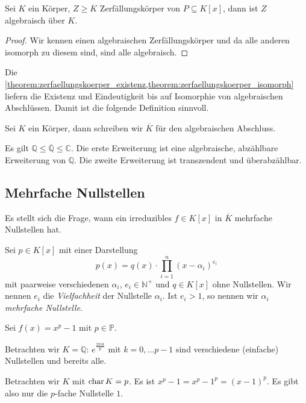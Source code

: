 \begin{corollary}
    Sei $K$ ein Körper, $Z \ge K$ Zerfällungskörper von $P \subseteq K[x]$, dann ist $Z$ algebraisch über $K$.
\end{corollary}
\begin{proof}
    Wir kennen einen algebraischen Zerfällungskörper und da alle anderen isomorph zu diesem sind, sind alle algebraisch.
\end{proof}

\begin{remark}
    Die \cref{theorem:zerfaellungskoerper_existenz,theorem:zerfaellungskoerper_isomorph} liefern die Existenz und Eindeutigkeit bis auf Isomorphie von algebraischen Abschlüssen. Damit ist die folgende Definition sinnvoll.
\end{remark}

\begin{definition}
    Sei $K$ ein Körper, dann schreiben wir $\overline{K}$ für den algebraischen Abschluss.
\end{definition}

\begin{remark}
    Es gilt $\mathbb{Q} \le \overline{\mathbb{Q}} \le \mathbb{C}$. Die erste Erweiterung ist eine algebraische, abzählbare Erweiterung von $\mathbb{Q}$. Die zweite Erweiterung ist transzendent und überabzählbar.
\end{remark}

\subsection{Mehrfache Nullstellen}
Es stellt sich die Frage, wann ein irreduzibles $f \in K[x]$ in $\overline{K}$ mehrfache Nullstellen hat.

\begin{definition}
    Sei $p \in K[x]$ mit einer Darstellung
    $$ p(x) = q(x) \cdot \prod_{i=1}^n (x-\alpha_i)^{e_i} $$
    mit paarweise verschiedenen $\alpha_i$, $e_i \in \mathbb{N}^+$ und $q \in K[x]$ ohne Nullstellen. Wir nennen $e_i$ die \emph{Vielfachheit} der Nullstelle $\alpha_i$. Ist $e_i > 1$, so nennen wir $\alpha_i$ \emph{mehrfache Nullstelle}.
\end{definition}

\begin{example}
    Sei $f(x) = x^p - 1$ mit $p \in \mathbb{P}$.

    Betrachten wir $K = \mathbb{Q}$: $e^\frac{2 \pi i k}{p}$ mit $k = 0, \ldots p-1$ sind verschiedene (einfache) Nullstellen und bereits alle.

    Betrachten wir $K$ mit $\operatorname{char} K = p$. Es ist $x^p - 1 = x^p - 1^p = (x-1)^p$. Es gibt also nur die $p$-fache Nullstelle $1$.
\end{example}

